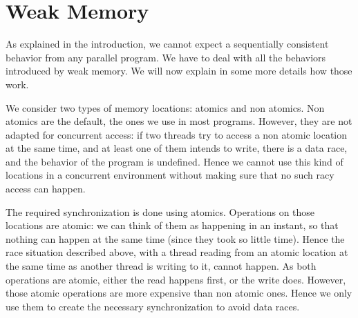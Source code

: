 
\section {Weak Memory}
As explained in the introduction, we cannot expect a sequentially consistent behavior from any parallel program. 
We have to deal with all the behaviors introduced by weak memory. We will now explain in some more details how those work.

We consider two types of memory locations: atomics and non atomics. Non atomics are the default, the ones we use in most programs. However, they are not adapted for concurrent access: if two threads try to access a non atomic location at the same time, and at least one of them intends to write, there is a data race, and the behavior of the program is undefined. Hence we cannot use this kind of locations in a concurrent environment without making sure that no such racy access can happen. 

The required synchronization is done using atomics. Operations on those locations are atomic: we can think of them as happening in an instant, so that nothing can happen at the same time (since they took so little time). Hence the race situation described above, with a thread reading from an atomic location at the same time as another thread is writing to it, cannot happen. As both operations are atomic, either the read happens first, or the write does. However, those atomic operations are more expensive than non atomic ones. Hence we only use them to create the necessary synchronization to avoid data races.


